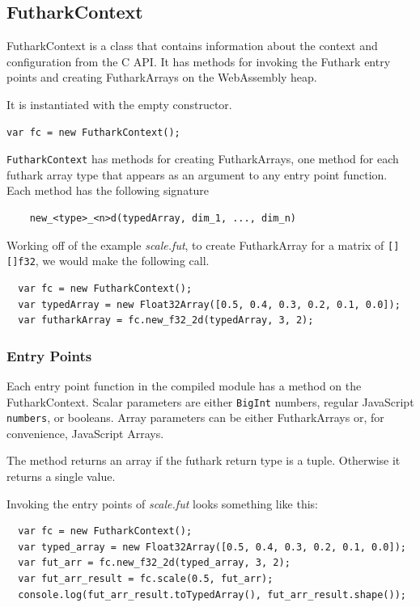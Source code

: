 \documentclass[11pt]{book}
\begin{document}
\subsection*{FutharkContext}

FutharkContext is a class that contains information about the context and configuration from the C API. It has methods for invoking the Futhark entry points and creating FutharkArrays on the WebAssembly heap. 

It is instantiated with the empty constructor.

\begin{verbatim}
var fc = new FutharkContext();
\end{verbatim}
 
\texttt{FutharkContext} has methods for creating FutharkArrays, one method for each futhark array type that appears as an argument to any entry point function. Each method has the following signature
\begin{verbatim}
    new_<type>_<n>d(typedArray, dim_1, ..., dim_n) 
\end{verbatim}

Working off of the example \textit{scale.fut}, to create FutharkArray for a matrix of \texttt{[][]f32}, we would make the following call. 

\begin{verbatim}
  var fc = new FutharkContext();
  var typedArray = new Float32Array([0.5, 0.4, 0.3, 0.2, 0.1, 0.0]);
  var futharkArray = fc.new_f32_2d(typedArray, 3, 2);
\end{verbatim}

\subsubsection*{Entry Points}
Each entry point function in the compiled module has a method on the FutharkContext. Scalar parameters are either \texttt{BigInt} numbers, regular JavaScript \texttt{numbers}, or booleans. Array parameters can be either FutharkArrays or, for convenience, JavaScript Arrays.

The method returns an array if the futhark return type is a tuple. Otherwise it returns a single value.

Invoking the entry points of \textit{scale.fut} looks something like this:

\begin{verbatim}
  var fc = new FutharkContext();
  var typed_array = new Float32Array([0.5, 0.4, 0.3, 0.2, 0.1, 0.0]);
  var fut_arr = fc.new_f32_2d(typed_array, 3, 2);
  var fut_arr_result = fc.scale(0.5, fut_arr);
  console.log(fut_arr_result.toTypedArray(), fut_arr_result.shape());
\end{verbatim}
\end{document}
